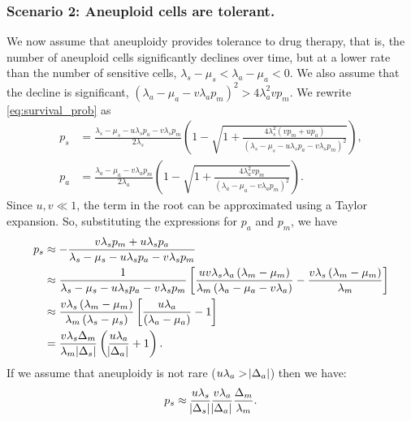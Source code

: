 \documentclass[12pt]{extarticle}
\begin{document}
\begin{appendices}
\subsubsection*{Scenario 2: Aneuploid cells are tolerant.} 

We now assume that aneuploidy provides tolerance to drug therapy, that is, the number of aneuploid cells significantly declines over time, but at a lower rate than the number of sensitive cells, $\lambda_s - \mu_s < \lambda_a - \mu_a < 0$. We also assume that the decline is significant, $\left(\lambda_a-\mu_a-v\lambda_ap_m\right)^2 > 4\lambda_a^2 v p_m$. %
We rewrite \cref{eq:survival_prob} as
\begin{equation}
\begin{aligned}
p_s&=\frac{\lambda_s-\mu_s-u\lambda_sp_a-v\lambda_sp_m}{2\lambda_s}\left(1-\sqrt{1+\frac{4\lambda_s^2\left(vp_m+up_a\right)}{\left(\lambda_s-\mu_s-u\lambda_sp_a-v\lambda_sp_m\right)^2}}\right), \\
p_a&=\frac{\lambda_a-\mu_a-v\lambda_ap_m}{2\lambda_a}\left(1-\sqrt{1+\frac{4\lambda_a^2vp_m}{\left(\lambda_a-\mu_a-v\lambda_ap_m\right)^2}}\right) .
\end{aligned}
\end{equation}
Since $u,v\ll1$, the term in the root can be approximated using a Taylor expansion. So, substituting the expressions for $p_a$ and $p_m$, we have
\begin{equation} \label{eq:survprobwinitial}
\begin{aligned}
p_s&\approx-\frac{v\lambda_sp_m+u\lambda_sp_a}{\lambda_s-\mu_s-u\lambda_sp_a-v\lambda_sp_m}\\
&\approx\frac{1}{\lambda_s-\mu_s-u\lambda_sp_a-v\lambda_sp_m}\left[\frac{uv\lambda_s\lambda_a\left(\lambda_m-\mu_m\right)}{\lambda_m\left(\lambda_a-\mu_a-v\lambda_a\right)}-\frac{v\lambda_s\left(\lambda_m-\mu_m\right)}{\lambda_m}\right]\\ 
&\approx\frac{v\lambda_s\left(\lambda_m-\mu_m\right)}{\lambda_m\left(\lambda_s-\mu_s\right)}\left[\frac{u\lambda_a}{\left(\lambda_a-\mu_a\right)}-1\right] \\
&=\frac{v\lambda_s\Delta_m}{\lambda_m \abs{\Delta_s}}\left(\frac{u\lambda_a}{\abs{\Delta_a}}+1\right) .
\end{aligned}
\end{equation}
If we assume that aneuploidy is not rare ($u\lambda_a>\abs{\Delta_a}$) then we have:
\begin{equation}\label{eq:pw_tolerant}
p_s\approx\frac{u\lambda_s}{\abs{\Delta_s}} \frac{v\lambda_a}{\abs{\Delta_a}} \frac{\Delta_m}{\lambda_m}.
\end{equation}


\end{appendices}
\end{document}
